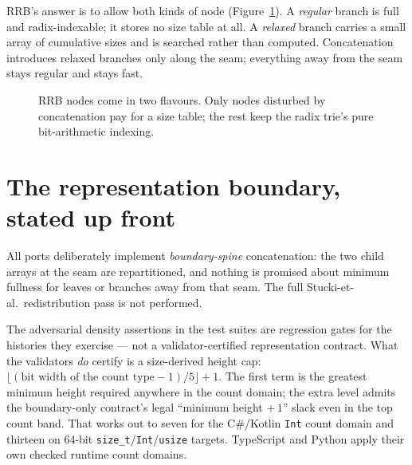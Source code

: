 \documentclass[11pt,twoside,openright]{book}
\newcommand{\code}[1]{\texorpdfstring{\textcolor{d7ink}{\texttt{#1}}}{#1}}
\newcommand{\term}[1]{\textit{#1}}
\begin{document}
RRB's answer is to allow both kinds of node (Figure~\ref{fig:rrb}). A
\term{regular} branch is full and radix-indexable; it stores no size table at
all. A \term{relaxed} branch carries a small array of cumulative sizes and is
searched rather than computed. Concatenation introduces relaxed branches only
along the seam; everything away from the seam stays regular and stays fast.

\begin{figure}[htbp]
\centering
{}
\caption{RRB nodes come in two flavours. Only nodes disturbed by concatenation
pay for a size table; the rest keep the radix trie's pure bit-arithmetic
indexing.}
\label{fig:rrb}
\end{figure}

\section{The representation boundary, stated up front}

\begin{caveatbox}
All ports deliberately implement \emph{boundary-spine} concatenation: the two
child arrays at the seam are repartitioned, and nothing is promised about
minimum fullness for leaves or branches away from that seam. The full
Stucki-et-al.\ redistribution pass is not performed.

The adversarial density assertions in the test suites are regression gates for
the histories they exercise --- not a validator-certified representation
contract. What the validators \emph{do} certify is a size-derived height cap:
$\lfloor (\text{bit width of the count type} - 1)/5 \rfloor + 1$. The first term
is the greatest minimum height required anywhere in the count domain; the extra
level admits the boundary-only contract's legal ``minimum height $+\,1$'' slack
even in the top count band. That works out to seven for the C\#/Kotlin
\code{Int} count domain and thirteen on 64-bit
\code{size\_t}/\code{Int}/\code{usize} targets. TypeScript and Python apply their
own checked runtime count domains.
\end{caveatbox}
\end{document}

